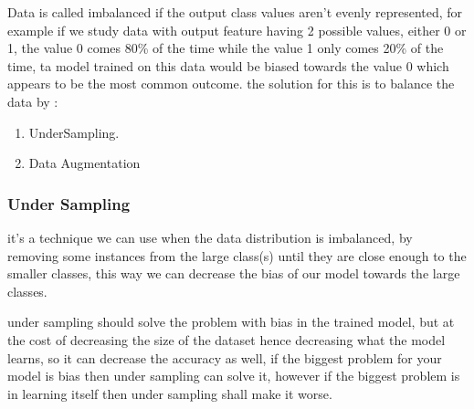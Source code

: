 Data is called imbalanced if the output class values aren't evenly represented, for example if we study data with output feature having 2 possible values, either 0 or 1, the value 0 comes 80\% of the time while the value 1 only comes 20\% of the time, ta model trained on this data would be biased towards the value 0 which appears to be the most common outcome.\newline
the solution for this is to balance the data by :
\begin{enumerate}
	\item UnderSampling.
	\item Data Augmentation
\end{enumerate}
\subsubsection{Under Sampling}
it's a technique we can use when the data distribution is imbalanced, by removing some instances from the large class(s) until they are close enough to the smaller classes, this way we can decrease the bias of our model towards the large classes.\newline 

under sampling should solve the problem with bias in the trained model, but at the cost of decreasing the size of the dataset hence decreasing what the model learns, so it can decrease the accuracy as well, if the biggest problem for your model is bias then under sampling can solve it, however if the biggest problem is in learning itself then under sampling shall make it worse.

